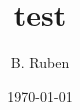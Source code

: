 \documentclass{article}
\begin{document}
\title{test}
\author{B. Ruben}
\date{\today}

\maketitle

\section{}
\end{document}

